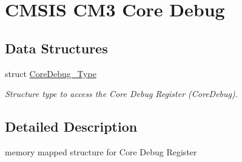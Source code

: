 \hypertarget{group___c_m_s_i_s___c_m3___core_debug}{\section{C\-M\-S\-I\-S C\-M3 Core Debug}
\label{group___c_m_s_i_s___c_m3___core_debug}
}
\subsection*{Data Structures}
\begin{DoxyCompactItemize}
\item 
struct \hyperlink{struct_core_debug___type}{Core\-Debug\-\_\-\-Type}
\begin{DoxyCompactList}\small\item\em Structure type to access the Core Debug Register (Core\-Debug). \end{DoxyCompactList}\end{DoxyCompactItemize}


\subsection{Detailed Description}
memory mapped structure for Core Debug Register 